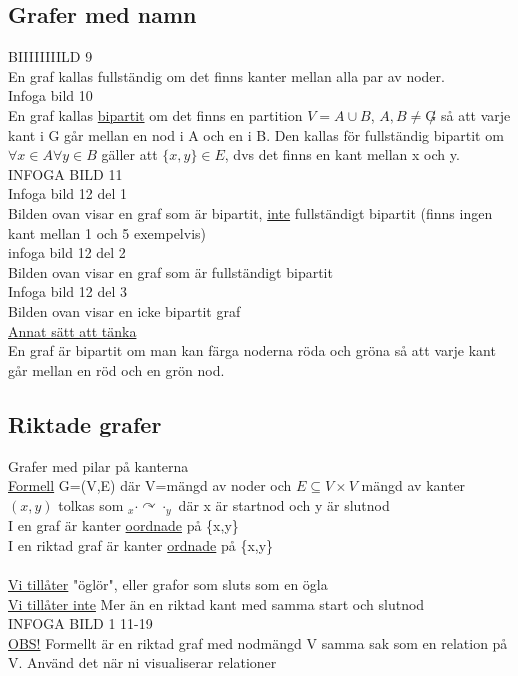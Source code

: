 \documentclass{article}
\begin{document}
    \subsection{Grafer med namn}
    BIIIIIIIILD 9\\
    En graf kallas fullständig om det finns kanter mellan alla par av noder.\\
    Infoga bild 10\\
    En graf kallas \underline{bipartit} om det finns en partition $V=A\cup B$, $A,B\neq \not G$ så att varje kant i G går mellan en nod i A och en i B.
    Den kallas för fullständig bipartit om $\forall x\in A \forall y\in B$ gäller att $\{x, y\}\in E$, dvs det finns en kant mellan x och y.\\
    INFOGA BILD 11\\
    Infoga bild 12 del 1\\
    Bilden ovan visar en graf som är bipartit, \underline{inte} fullständigt bipartit (finns ingen kant mellan 1 och 5 exempelvis)\\
    infoga bild 12 del 2\\
    Bilden ovan visar en graf som är fullständigt bipartit\\
    Infoga bild 12 del 3\\
    Bilden ovan visar en icke bipartit graf\\
    \underline{Annat sätt att tänka}\\
    En graf är bipartit om man kan färga noderna röda och gröna så att varje kant går mellan en röd och en grön nod.
    \subsection{Riktade grafer}
    Grafer med pilar på kanterna\\
    \underline{Formell} G=(V,E) där V=mängd av noder och $E\subseteq V\times V$ mängd av kanter\\
    $(x,y)$ tolkas som $_{x}\cdot \curvearrowright \cdot_{y}$ där x är startnod och y är slutnod\\
    I en graf är kanter \underline{oordnade} på \{x,y\}\\
    I en riktad graf är kanter \underline{ordnade} på \{x,y\}\\\\
    \underline{Vi tillåter} "öglör", eller grafor som sluts som en ögla\\
    \underline{Vi tillåter inte} Mer än en riktad kant med samma start och slutnod\\INFOGA BILD 1 11-19\\
    \underline{OBS!} Formellt är en riktad graf med nodmängd V samma sak som en relation på V. Använd det när ni visualiserar relationer
\end{document}

